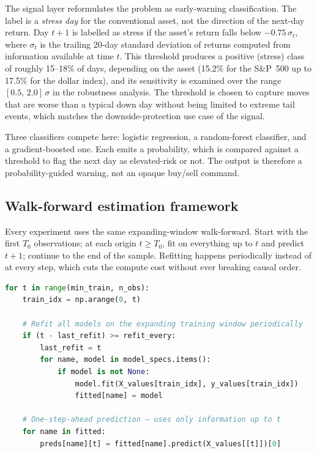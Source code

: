The signal layer reformulates the problem as early-warning classification. The label is a \emph{stress day} for the conventional asset, not the direction of the next-day return. Day $t+1$ is labelled as stress if the asset's return falls below $-0.75\,\sigma_t$, where $\sigma_t$ is the trailing 20-day standard deviation of returns computed from information available at time $t$. This threshold produces a positive (stress) class of roughly 15--18\% of days, depending on the asset (15.2\% for the S\&P~500 up to 17.5\% for the dollar index), and its sensitivity is examined over the range $[0.5,\,2.0]\,\sigma$ in the robustness analysis. The threshold is chosen to capture moves that are worse than a typical down day without being limited to extreme tail events, which matches the downside-protection use case of the signal.

Three classifiers compete here: logistic regression, a random-forest classifier, and a gradient-boosted one. Each emits a probability, which is compared against a threshold to flag the next day as elevated-risk or not. The output is therefore a probability-guided warning, not an opaque buy/sell command.

\subsection{Walk-forward estimation framework}

Every experiment uses the same expanding-window walk-forward. Start with the first $T_0$ observations; at each origin $t \geq T_0$, fit on everything up to $t$ and predict $t+1$; continue to the end of the sample. Refitting happens periodically instead of at every step, which cuts the compute cost without ever breaking causal order.

\begin{lstlisting}[language=Python, caption={Expanding-window walk-forward loop (\texttt{pipeline.py}).}, label=lst:walkforward]
for t in range(min_train, n_obs):
    train_idx = np.arange(0, t)

    # Refit all models on the expanding training window periodically
    if (t - last_refit) >= refit_every:
        last_refit = t
        for name, model in model_specs.items():
            if model is not None:
                model.fit(X_values[train_idx], y_values[train_idx])
                fitted[name] = model

    # One-step-ahead prediction — uses only information up to t
    for name in fitted:
        preds[name][t] = fitted[name].predict(X_values[[t]])[0]
\end{lstlisting}


